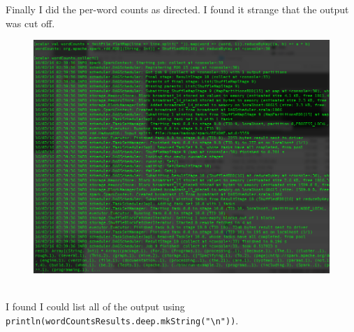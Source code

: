 \documentclass[10pt]{article}
\begin{document}
%
\par
Finally I did the per-word counts as directed. I found it strange that the output was cut off. 
\begin{figure}[!h]
\includegraphics[scale=0.37]{wordCounts.png}
\centering
\end{figure}\\
\indent I found I could list all of the output using \verb|println(wordCountsResults.deep.mkString("\n"))|.
\pagebreak
\end{document}
